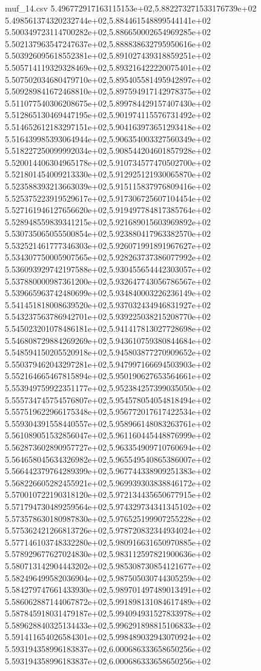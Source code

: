 \begin{filecontents*}{muf_14.csv}
5.496772917163115153e+02,5.882273271533176739e+02
5.498561374320232744e+02,5.884461548899544141e+02
5.500349723114700282e+02,5.886650002654969285e+02
5.502137963547247637e+02,5.888838632795950616e+02
5.503926095618552381e+02,5.891027439318859251e+02
5.505714119329328469e+02,5.893216422220075401e+02
5.507502034680479710e+02,5.895405581495942897e+02
5.509289841672468810e+02,5.897594917142978375e+02
5.511077540306208675e+02,5.899784429157407430e+02
5.512865130469447195e+02,5.901974115576731492e+02
5.514652612183297151e+02,5.904163973651293418e+02
5.516439985393064944e+02,5.906354003327560349e+02
5.518227250099992034e+02,5.908544204601857928e+02
5.520014406304965178e+02,5.910734577470502700e+02
5.521801454009213330e+02,5.912925121930065870e+02
5.523588393213663039e+02,5.915115837976809416e+02
5.525375223919529617e+02,5.917306725607104454e+02
5.527161946127656620e+02,5.919497784817385764e+02
5.528948559839341215e+02,5.921689015603969892e+02
5.530735065055500854e+02,5.923880417963382570e+02
5.532521461777346303e+02,5.926071991891967627e+02
5.534307750005907565e+02,5.928263737386077992e+02
5.536093929742197588e+02,5.930455654442303057e+02
5.537880000987361200e+02,5.932647743056786567e+02
5.539665963742480699e+02,5.934840003226236149e+02
5.541451818008639520e+02,5.937032434946831927e+02
5.543237563786942701e+02,5.939225038215208770e+02
5.545023201078486181e+02,5.941417813027728698e+02
5.546808729884269269e+02,5.943610759380844684e+02
5.548594150205520918e+02,5.945803877270909652e+02
5.550379462043297281e+02,5.947997166694503903e+02
5.552164665467815894e+02,5.950190627653564661e+02
5.553949759922351177e+02,5.952384257399035050e+02
5.555734745754576807e+02,5.954578054054818494e+02
5.557519622966175348e+02,5.956772017617422534e+02
5.559304391558440557e+02,5.958966148083263761e+02
5.561089051532856047e+02,5.961160445448876999e+02
5.562873602890957727e+02,5.963354909710760694e+02
5.564658045634326982e+02,5.965549540865386007e+02
5.566442379764289399e+02,5.967744338909251383e+02
5.568226605282455921e+02,5.969939303838846172e+02
5.570010722190318120e+02,5.972134435650677915e+02
5.571794730489259564e+02,5.974329734341345102e+02
5.573578630180987830e+02,5.976525199907255228e+02
5.575362421266813726e+02,5.978720832344934024e+02
5.577146103748332280e+02,5.980916631650970885e+02
5.578929677627024830e+02,5.983112597821900636e+02
5.580713142904443202e+02,5.985308730854121677e+02
5.582496499582036904e+02,5.987505030744305259e+02
5.584279747661433930e+02,5.989701497489013491e+02
5.586062887144067872e+02,5.991898131084617489e+02
5.587845918031479187e+02,5.994094931527833978e+02
5.589628840325134433e+02,5.996291898815106833e+02
5.591411654026584301e+02,5.998489032943070924e+02
5.593194358996183837e+02,6.000686333658650256e+02
5.593194358996183837e+02,6.000686333658650256e+02
\end{filecontents*}

